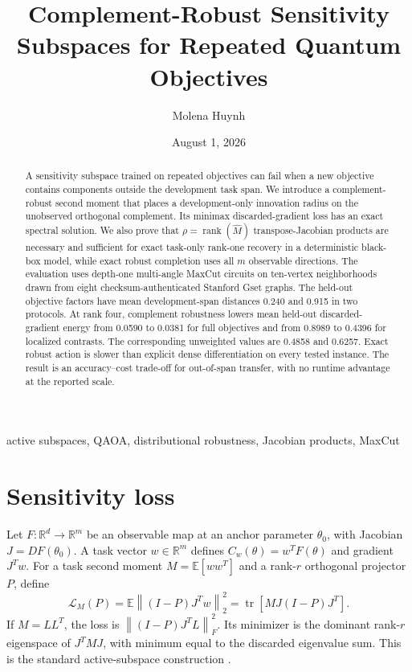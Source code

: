 \documentclass[10pt,letterpaper,twoside]{article}
\newcommand{\R}{\mathbb R}
\newcommand{\I}{I}
\newcommand{\J}{J}
\newcommand{\M}{M}
\newcommand{\norm}[1]{\left\lVert #1\right\rVert}
\newcommand{\tr}{\operatorname{tr}}
\newcommand{\rank}{\operatorname{rank}}
\begin{document}
\title{Complement-Robust Sensitivity Subspaces for Repeated Quantum Objectives}
\author{Molena Huynh}
\date{August 1, 2026}

\maketitle

\begin{abstract}
A sensitivity subspace trained on repeated objectives can fail when a new
objective contains components outside the development task span.  We introduce
a complement-robust second moment that places a development-only innovation
radius on the unobserved orthogonal complement.  Its minimax discarded-gradient
loss has an exact spectral solution.  We also prove that
$\rho=\rank(\widehat M)$ transpose-Jacobian products are necessary and
sufficient for exact task-only rank-one recovery in a deterministic black-box
model, while exact robust completion uses all $m$ observable directions.  The
evaluation uses depth-one multi-angle MaxCut circuits on ten-vertex
neighborhoods drawn from eight checksum-authenticated Stanford Gset graphs.
The held-out objective factors have mean development-span distances 0.240 and
0.915 in two protocols.  At rank four, complement robustness lowers mean
held-out discarded-gradient energy from 0.0590 to 0.0381 for full objectives
and from 0.8989 to 0.4396 for localized contrasts.  The corresponding
unweighted values are 0.4858 and 0.6257.  Exact robust action is slower than
explicit dense differentiation on every tested instance.  The result is an
accuracy--cost trade-off for out-of-span transfer, with no runtime advantage
at the reported scale.
\end{abstract}

\begin{keywords}
active subspaces, QAOA, distributional robustness, Jacobian products, MaxCut
\end{keywords}

\section{Sensitivity loss}

Let $F:\R^d\rightarrow\R^m$ be an observable map at an anchor parameter
$\theta_0$, with Jacobian $\J=DF(\theta_0)$.  A task vector $w\in\R^m$
defines $C_w(\theta)=w^TF(\theta)$ and gradient $\J^Tw$.  For a task second
moment $\M=\mathbb E[ww^T]$ and a rank-$r$ orthogonal projector $P$, define
\begin{equation}
 \mathcal L_{\M}(P)=
 \mathbb E\norm{(\I-P)\J^Tw}_2^2
 =\tr\!\left[\M\J(\I-P)\J^T\right].                 \label{eq:loss}
\end{equation}
If $\M=LL^T$, the loss is
$\norm{(\I-P)\J^TL}_F^2$.  Its minimizer is the dominant rank-$r$
eigenspace of $\J^T\M\J$, with minimum equal to the discarded eigenvalue sum.
This is the standard active-subspace construction
\cite{constantine2014active,constantine2015active,ipsen2009numerical}.
\end{document}
